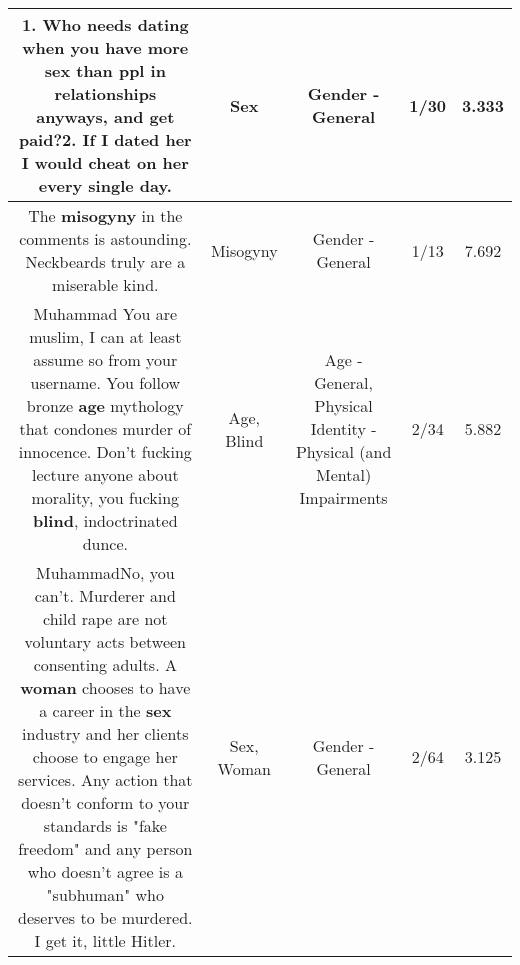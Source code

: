 \documentclass[11pt]{article}
\newlength\mylength
\begin{document}
\begin{center}
\begin{longtable}{|C{.65\mylength}|C{.30\mylength}|C{.12\mylength}|C{.12\mylength}|C{.12\mylength}|}
  \small 1. Who needs dating when you have more \textbf{sex} than ppl in relationships anyways, and get paid?2. If I dated her I would cheat on her every single day.\normalsize   & Sex & Gender - General & 1/30 & 3.333 \\  \hline
  \small The \textbf{misogyny} in the comments is astounding. Neckbeards truly are a miserable kind.\normalsize   & Misogyny & Gender - General & 1/13 & 7.692 \\  \hline
  \small Muhammad You are muslim, I can at least assume so from your username. You follow bronze \textbf{age} mythology that condones murder of innocence. Don't fucking lecture anyone about morality, you fucking \textbf{blind}, indoctrinated dunce.\normalsize   & Age, Blind & Age - General, Physical Identity - Physical (and Mental) Impairments & 2/34 & 5.882 \\  \hline
  \small MuhammadNo, you can't. Murderer and child rape are not voluntary acts between consenting adults. A \textbf{woman} chooses to have a career in the \textbf{sex} industry and her clients choose to engage her services. Any action that doesn't conform to your standards is "fake freedom" and any person who doesn't agree is a "subhuman" who deserves to be murdered. I get it, little Hitler.\normalsize   & Sex, Woman & Gender - General & 2/64 & 3.125 \\  \hline

\end{longtable}
\end{center}
\end{document}
